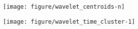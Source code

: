 \documentclass{article}
\begin{document}
\begin{figure}[ht]
  \centering
  \texttt{[image: figure/wavelet\_centroids-n]}
  \caption{\label{fig:label} }
\end{figure}

\begin{figure}[ht]
  \centering
  \texttt{[image: figure/wavelet\_time\_cluster-1]}
  \caption{\label{fig:label} }
\end{figure}



\end{document}

